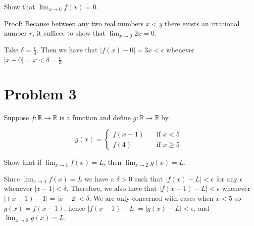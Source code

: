 \documentclass{article}
\begin{document}
Show that $\lim_{x \rightarrow 0} f(x) = 0$. 

Proof: Because between any two real numbers $x < y$ there exists an irrational number $r$, it suffices to show that $\lim_{x \rightarrow 0} 2x = 0$. 

Take $\delta = \frac{\epsilon}{3}$. Then we have that $\left|f(x) - 0\right| = 3x < \epsilon$  whenever $\left|x - 0\right| = x < \delta = \frac{\epsilon}{3}$. 

\section*{Problem 3}

Suppose $f: \mathbb{R} \rightarrow \mathbb{R}$ is a function and define $g: \mathbb{R} \rightarrow \mathbb{R}$ by 

\begin{equation*}
        g(x) = \left\{
\begin{array}{ll}
        f(x - 1) & \quad \text{if $x < 5$} \\
        f(4) & \quad \text{if $x \geq 5$}
\end{array}\right.
\end{equation*}

Show that if $\lim_{x \rightarrow 1} f(x)  = L$, then $\lim_{x \rightarrow 2} g(x) = L$. 

Since $\lim_{x \rightarrow 1} f(x) = L$ we have a $\delta > 0$ such that $\left|f(x) - L \right| < \epsilon$ for any $\epsilon$ whenever $\left|x - 1\right| < \delta$. Therefore, we also have that $\left|f(x - 1) - L\right| < \epsilon$ whenever $\left|(x - 1) - 1\right| = \left|x - 2\right| < \delta$. We are only concerned with cases when $x < 5$ so $g(x) = f(x - 1)$, hence $\left|f(x - 1) - L\right| = \left|g(x) - L\right| < \epsilon$, and $\lim_{x \rightarrow 2} g(x) = L$. 
\end{document}
